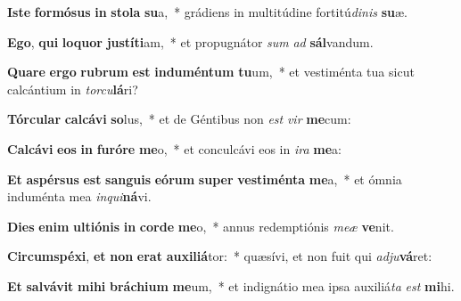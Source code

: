 \item \textbf{Is}\textbf{te} \textbf{for}\textbf{mó}\textbf{sus} \textbf{in} \textbf{sto}\textbf{la} \textbf{su}a,~* grádiens in multitúdine fortitú\textit{di}\textit{nis} \textbf{su}æ.
\item \textbf{E}\textbf{go}, \textbf{qui} \textbf{lo}\textbf{quor} \textbf{jus}\textbf{tí}\textbf{ti}am,~* et propugnátor \textit{sum} \textit{ad} \textbf{sál}vandum.
\item \textbf{Qua}\textbf{re} \textbf{er}\textbf{go} \textbf{ru}\textbf{brum} \textbf{est} \textbf{ind}\textbf{u}\textbf{mén}\textbf{tum} \textbf{tu}um,~* et vestiménta tua sicut calcántium in \textit{tor}\textit{cu}\textbf{lá}ri?
\item \textbf{Tór}\textbf{cu}\textbf{lar} \textbf{cal}\textbf{cá}\textbf{vi} \textbf{so}lus,~* et de Géntibus non \textit{est} \textit{vir} \textbf{me}cum:
\item \textbf{Cal}\textbf{cá}\textbf{vi} \textbf{e}\textbf{os} \textbf{in} \textbf{fu}\textbf{ró}\textbf{re} \textbf{me}o,~* et conculcávi eos in \textit{i}\textit{ra} \textbf{me}a:
\item \textbf{Et} \textbf{a}\textbf{spér}\textbf{sus} \textbf{est} \textbf{san}\textbf{guis} \textbf{e}\textbf{ó}\textbf{rum} \textbf{su}\textbf{per} \textbf{ves}\textbf{ti}\textbf{mén}\textbf{ta} \textbf{me}a,~* et ómnia induménta mea \textit{in}\textit{qui}\textbf{ná}vi.
\item \textbf{Di}\textbf{es} \textbf{e}\textbf{nim} \textbf{ul}\textbf{ti}\textbf{ó}\textbf{nis} \textbf{in} \textbf{cor}\textbf{de} \textbf{me}o,~* annus redemptiónis \textit{me}\textit{æ} \textbf{ve}nit.
\item \textbf{Cir}\textbf{cum}\textbf{spé}\textbf{xi}, \textbf{et} \textbf{non} \textbf{e}\textbf{rat} \textbf{au}\textbf{xi}\textbf{li}\textbf{á}tor:~* quæsívi, et non fuit qui \textit{ad}\textit{ju}\textbf{vá}ret:
\item \textbf{Et} \textbf{sal}\textbf{vá}\textbf{vit} \textbf{mi}\textbf{hi} \textbf{brá}\textbf{chi}\textbf{um} \textbf{me}um,~* et indignátio mea ipsa auxiliá\textit{ta} \textit{est} \textbf{mi}hi.
